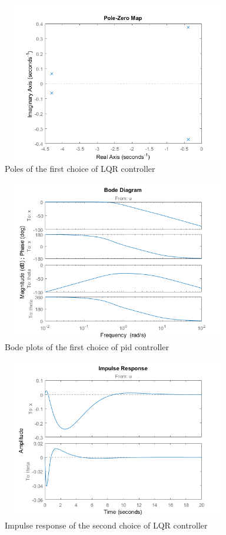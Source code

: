\documentclass [12pt,letterpaper]{exam}
\begin{document}
\begin{figure}[H]
  \centering
    \includegraphics[width=10.15cm, height=7cm]{lqr_poles} 
  \caption{Poles of the first choice of LQR controller}
  \label{fig:lqr_poles}
\end{figure}

\begin{figure}[H]
  \centering
    \includegraphics[width=10.15cm, height=7cm]{lqr_bode} 
  \caption{Bode plots of the first choice of pid controller}
  \label{fig:lqr_bode}
\end{figure}

\begin{figure}[H]
  \centering
    \includegraphics[width=10.15cm, height=7cm]{lqr_impulse} 
  \caption{Impulse response of the second choice of LQR controller}
  \label{fig:lqr_impulse}
\end{figure}
\end{document}
